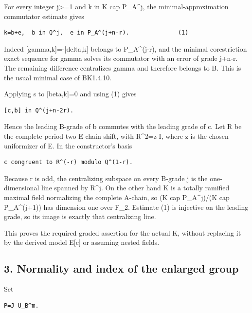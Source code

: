 For every integer j\textgreater=1 and k in K cap P\_A\^{}j, the
minimal-approximation commutator estimate gives

\begin{Verbatim}[fontsize=\small,breaklines=true,breakanywhere=true]
k=b+e,  b in Q^j,  e in P_A^(j+n-r).              (1)
\end{Verbatim}

Indeed {[}gamma,k{]}=-{[}delta,k{]} belongs to P\_A\^{}(j-r), and the
minimal corestriction exact sequence for gamma solves its commutator
with an error of grade j+n-r. The remaining difference centralizes gamma
and therefore belongs to B. This is the usual minimal case of BK1.4.10.

Applying s to {[}beta,k{]}=0 and using (1) gives

\begin{Verbatim}[fontsize=\small,breaklines=true,breakanywhere=true]
[c,b] in Q^(j+n-2r).
\end{Verbatim}

Hence the leading B-grade of b commutes with the leading grade of c. Let
R be the complete period-two E-chain shift, with R\^{}2=z I, where z is
the chosen uniformizer of E. In the constructor's basis

\begin{Verbatim}[fontsize=\small,breaklines=true,breakanywhere=true]
c congruent to R^(-r) modulo Q^(1-r).
\end{Verbatim}

Because r is odd, the centralizing subspace on every B-grade j is the
one-dimensional line spanned by R\^{}j. On the other hand K is a totally
ramified maximal field normalizing the complete A-chain, so (K cap
P\_A\^{}j)/(K cap P\_A\^{}(j+1)) has dimension one over F\_2. Estimate
(1) is injective on the leading grade, so its image is exactly that
centralizing line.

This proves the required graded assertion for the actual K, without
replacing it by the derived model E{[}c{]} or assuming nested fields.

\hypertarget{rank4-normality-and-index-of-the-enlarged-group}{%
\subsection{3. Normality and index of the enlarged
group}\label{rank4-normality-and-index-of-the-enlarged-group}}

Set

\begin{Verbatim}[fontsize=\small,breaklines=true,breakanywhere=true]
P=J U_B^m.
\end{Verbatim}


